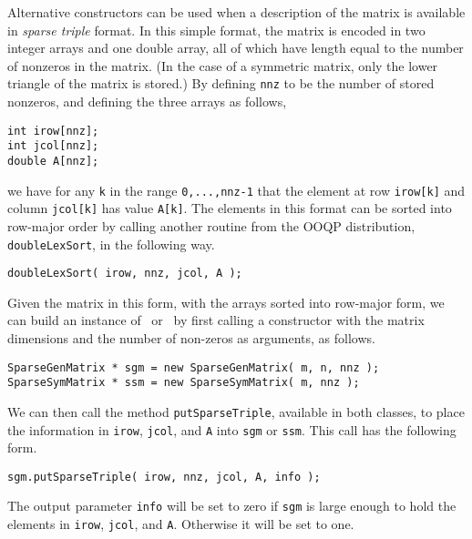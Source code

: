 Alternative constructors can be used when a description of the matrix
is available in {\em sparse triple} format. In this simple format, the
matrix is encoded in two integer arrays and one double array, all of
which have length equal to the number of nonzeros in the matrix. (In
the case of a symmetric matrix, only the lower triangle of the matrix
is stored.) By defining \texttt{nnz} to be the number of stored
nonzeros, and defining the three arrays as follows,
\begin{verbatim}
int irow[nnz];
int jcol[nnz];
double A[nnz];
\end{verbatim}
we have for any \texttt{k} in the range \texttt{0,...,nnz-1} that the
element at row \texttt{irow[k]} and column \texttt{jcol[k]} has value
\texttt{A[k]}. The elements in this format can be sorted into
row-major order by calling another routine from the OOQP distribution,
\texttt{doubleLexSort}, in the following way.
\begin{verbatim}
doubleLexSort( irow, nnz, jcol, A );
\end{verbatim}

Given the matrix in this form, with the arrays sorted into row-major
form, we can build an instance of \SparseGenMatrix\ or
\SparseSymMatrix\ by first calling a constructor with the matrix
dimensions and the number of non-zeros as arguments, as follows.
\begin{verbatim}
SparseGenMatrix * sgm = new SparseGenMatrix( m, n, nnz );
SparseSymMatrix * ssm = new SparseSymMatrix( m, nnz );
\end{verbatim}
We can then call the method \texttt{putSparseTriple}, available in
both classes, to place the information in \texttt{irow},
\texttt{jcol}, and \texttt{A} into \texttt{sgm} or \texttt{ssm}. This
call has the following form.
\begin{verbatim}
sgm.putSparseTriple( irow, nnz, jcol, A, info ); 
\end{verbatim}
The output parameter \texttt{info} will be set to zero if \texttt{sgm}
is large enough to hold the elements in \texttt{irow}, \texttt{jcol},
and \texttt{A}. Otherwise it will be set to one.

